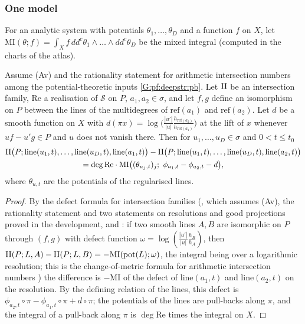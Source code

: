 \subsubsection*{One model}
For an analytic system with potentials $\theta_1,\dots,\theta_D$ and a function $f$ on $X$, let
$\mathrm{MI}(\theta;f)=\int_Xf\,dd^c\theta_1\wedge\dots\wedge dd^c\theta_D$ be the mixed integral (computed in the charts
of the atlas).

\begin{lemma}\label{pf:tower:step}
Assume \textup{(Av)} and the rationality statement for arithmetic intersection numbers among the potential-theoretic inputs
\ref{G:pf:deepstr:pb}. Let $\mathrm{II}$ be an intersection family, $\mathrm{Re}$ a realisation of $\mathcal S$ on $P$,
$a_1,a_2\in\sigma$, and let
$f,g$ define an isomorphism on $P$ between the lines of the multidegrees of $\mathrm{ref}(a_1)$ and $\mathrm{ref}(a_2)$. Let
$d$ be a smooth function on $X$ with
$d(\pi x)=\log\bigl(\frac{|u'|}{|u|}\frac{h_{\mathrm{ref}(a_2)}}{h_{\mathrm{ref}(a_1)}}\bigr)$ at the lift of $x$ whenever
$uf-u'g\in P$ and $u$ does not vanish there. Then for $u_1,\dots,u_D\in\sigma$ and $0<t\le t_0$
\begin{multline*}
\towerII\bigl(P;\mathrm{line}(u_1,t),\dots,\mathrm{line}(u_D,t),\mathrm{line}(a_1,t)\bigr)
-\towerII\bigl(P;\mathrm{line}(u_1,t),\dots,\mathrm{line}(u_D,t),\mathrm{line}(a_2,t)\bigr)\\
=\deg\mathrm{Re}\cdot\mathrm{MI}\bigl((\theta_{u_j,t})_j;\ \phi_{a_1,t}-\phi_{a_2,t}-d\bigr),
\end{multline*}
where $\theta_{u,t}$ are the potentials of the regularised lines.
\end{lemma}

\begin{proof}
By the defect formula for intersection families
(, which assumes (Av), the rationality statement and two
statements on resolutions and good projections proved in the development,
 and
: if two smooth lines $A,B$ are isomorphic on
$P$ through $(f,g)$ with defect function $\omega=\log(\frac{|u'|}{|u|}\frac{h_B}{h_A})$, then
$\mathrm{II}(P;L,A)-\mathrm{II}(P;L,B)=-\mathrm{MI}(\mathrm{pot}(L);\omega)$, the integral being over a logarithmic
resolution; this is the change-of-metric formula for arithmetic intersection numbers \cite{GilletSoule1990,BostGilletSoule1994})
the difference is $-\mathrm{MI}$ of the defect of $\mathrm{line}(a_1,t)$ and $\mathrm{line}(a_2,t)$ on the resolution.
By the defining relation of the lines, this defect is
$\phi_{a_2,t}\circ\pi-\phi_{a_1,t}\circ\pi+d\circ\pi$; the potentials of the lines are pull-backs along $\pi$, and the
integral of a pull-back along $\pi$ is $\deg\mathrm{Re}$ times the integral on $X$.
\end{proof}

